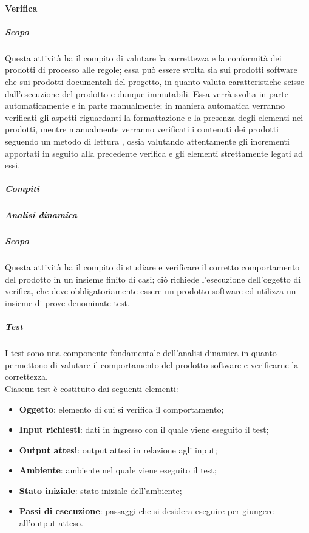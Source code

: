 \paragraph{Verifica}
\label{par:verifica}

\subparagraph{Scopo}
Questa attività ha il compito di valutare la correttezza e la conformità dei prodotti di processo alle regole; essa può essere svolta sia
sui prodotti software che sui prodotti documentali del progetto, in quanto valuta caratteristiche scisse dall'esecuzione del prodotto e
dunque immutabili. Essa verrà svolta in parte automaticamente e in parte manualmente; in maniera automatica verranno verificati gli
aspetti riguardanti la formattazione e la presenza degli elementi nei prodotti, mentre manualmente verranno verificati i contenuti dei
prodotti seguendo un metodo di lettura , ossia valutando attentamente gli incrementi apportati in seguito alla
precedente verifica e gli elementi strettamente legati ad essi.

\subparagraph{Compiti}
\label{par:verifica:compiti}

\subparagraph{Analisi dinamica}
\label{sub:verifica:analisi_dinamica}

\subparagraph{Scopo}

Questa attività ha il compito di studiare e verificare il corretto comportamento del prodotto in un insieme finito di casi; ciò richiede
l'esecuzione dell'oggetto di verifica, che deve obbligatoriamente essere un prodotto software ed utilizza un insieme di prove denominate
test.

\subparagraph{Test}
\label{par:verifica:test}

I test sono una componente fondamentale dell'analisi dinamica in quanto permettono di valutare il comportamento del prodotto software e
verificarne la correttezza.\\
Ciascun test è costituito dai seguenti elementi:
\begin{itemize}
    \item \textbf{Oggetto}: elemento di cui si verifica il comportamento;
    \item \textbf{Input richiesti}: dati in ingresso con il quale viene eseguito il test;
    \item \textbf{Output attesi}: output attesi in relazione agli input;
    \item \textbf{Ambiente}: ambiente nel quale viene eseguito il test;
    \item \textbf{Stato iniziale}: stato iniziale dell'ambiente;
    \item \textbf{Passi di esecuzione}: passaggi che si desidera eseguire per giungere all'output atteso.
\end{itemize}

